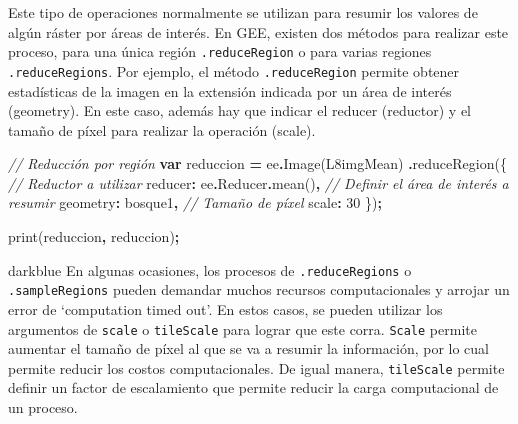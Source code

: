 \documentclass[
  12pt,
  letterpaper,
  twoside]{book}
\newenvironment{Shaded}{\begin{snugshade}}{\end{snugshade}}
\newcommand{\AttributeTok}[1]{\textcolor[rgb]{0.77,0.63,0.00}{#1}}
\newcommand{\CommentTok}[1]{\textcolor[rgb]{0.56,0.35,0.01}{\textit{#1}}}
\newcommand{\DataTypeTok}[1]{\textcolor[rgb]{0.13,0.29,0.53}{#1}}
\newcommand{\DecValTok}[1]{\textcolor[rgb]{0.00,0.00,0.81}{#1}}
\newcommand{\FunctionTok}[1]{\textcolor[rgb]{0.00,0.00,0.00}{#1}}
\newcommand{\KeywordTok}[1]{\textcolor[rgb]{0.13,0.29,0.53}{\textbf{#1}}}
\newcommand{\NormalTok}[1]{#1}
\newcommand{\OperatorTok}[1]{\textcolor[rgb]{0.81,0.36,0.00}{\textbf{#1}}}
\newcommand{\StringTok}[1]{\textcolor[rgb]{0.31,0.60,0.02}{#1}}
\begin{document}
Este tipo de operaciones normalmente se utilizan para resumir los valores de algún ráster por áreas de interés. En GEE, existen dos métodos para realizar este proceso, para una única región \texttt{.reduceRegion} o para varias regiones \texttt{.reduceRegions}. Por ejemplo, el método \texttt{.reduceRegion} permite obtener estadísticas de la imagen en la extensión indicada por un área de interés (geometry). En este caso, además hay que indicar el reducer (reductor) y el tamaño de píxel para realizar la operación (scale).

\begin{Shaded}
\begin{Highlighting}[]
\CommentTok{// Reducción por región}
\KeywordTok{var}\NormalTok{ reduccion }\OperatorTok{=}\NormalTok{ ee}\OperatorTok{.}\FunctionTok{Image}\NormalTok{(L8imgMean)}
  \OperatorTok{.}\FunctionTok{reduceRegion}\NormalTok{(\{}
    \CommentTok{// Reductor a utilizar}
    \DataTypeTok{reducer}\OperatorTok{:}\NormalTok{ ee}\OperatorTok{.}\AttributeTok{Reducer}\OperatorTok{.}\FunctionTok{mean}\NormalTok{()}\OperatorTok{,}
    \CommentTok{// Definir el área de interés a resumir}
    \DataTypeTok{geometry}\OperatorTok{:}\NormalTok{ bosque1}\OperatorTok{,}
    \CommentTok{// Tamaño de píxel}
    \DataTypeTok{scale}\OperatorTok{:} \DecValTok{30}
\NormalTok{  \})}\OperatorTok{;}
  
\FunctionTok{print}\NormalTok{(reduccion}\OperatorTok{,} \StringTok{\textquotesingle{}reduccion\textquotesingle{}}\NormalTok{)}\OperatorTok{;}
\end{Highlighting}
\end{Shaded}

\begin{bluebox2}

\begin{awesomeblock}{5pt}{\faLightbulb}{darkblue}
En algunas ocasiones, los procesos de \texttt{.reduceRegions} o \texttt{.sampleRegions} pueden demandar muchos recursos computacionales y arrojar un error de `computation timed out'. En estos casos, se pueden utilizar los argumentos de \texttt{scale} o \texttt{tileScale} para lograr que este corra. \texttt{Scale} permite aumentar el tamaño de píxel al que se va a resumir la información, por lo cual permite reducir los costos computacionales. De igual manera, \texttt{tileScale} permite definir un factor de escalamiento que permite reducir la carga computacional de un proceso.

\end{awesomeblock}

\end{bluebox2}
\end{document}
